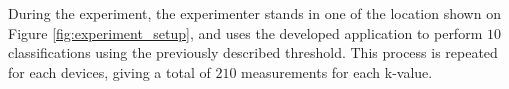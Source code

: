\begin{table}[]
    \caption{The devices used in during classification and their supported Bluetooth version.}
    \label{tab:devicesAndBluetooth}
\end{table}

During the experiment, the experimenter stands in one of the location shown on Figure \ref{fig:experiment_setup}, and uses the developed application to perform $10$ classifications using the previously described threshold.
This process is repeated for each devices, giving a total of $210$ measurements for each k-value.